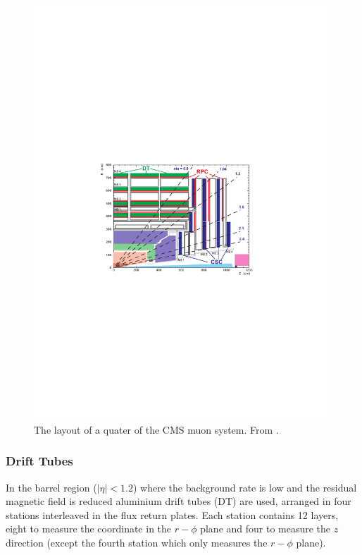 \begin{figure}[htbp]
  \centering
  \includegraphics[width=0.98\textwidth]{muon_system}
  \caption{The layout of a quater of the CMS muon system. From \cite{chatrchyan2008cms}.}
  \label{fig:muon_system}
\end{figure}

\subsubsection{Drift Tubes}
In the barrel region ($|\eta| < 1.2$)
where the background rate is low and the residual magnetic field is reduced
 aluminium drift tubes (DT) are used,
arranged in four stations interleaved in the flux return
plates. 
Each station contains 12 layers, eight to measure the coordinate in the
$r-\phi$ plane and four to measure the $z$ direction (except the fourth station
which only measures the $r-\phi$ plane). 

